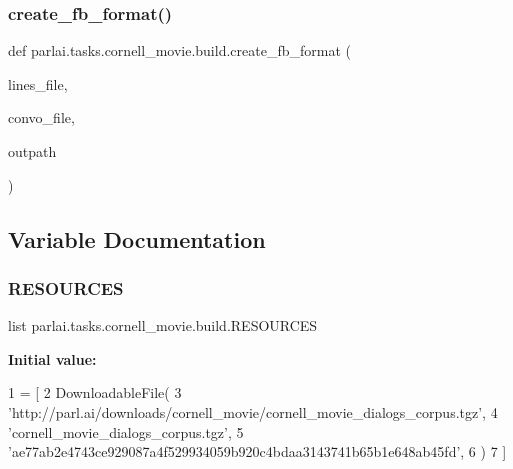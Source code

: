 \mbox{\label{namespaceparlai_1_1tasks_1_1cornell__movie_1_1build_ad02efe0879bce0da293ba177112e1af3}} 
\subsubsection{\texorpdfstring{create\+\_\+fb\+\_\+format()}{create\_fb\_format()}}
{\footnotesize\ttfamily def parlai.\+tasks.\+cornell\+\_\+movie.\+build.\+create\+\_\+fb\+\_\+format (\begin{DoxyParamCaption}\item[{}]{lines\+\_\+file,  }\item[{}]{convo\+\_\+file,  }\item[{}]{outpath }\end{DoxyParamCaption})}



\subsection{Variable Documentation}
\mbox{\label{namespaceparlai_1_1tasks_1_1cornell__movie_1_1build_a3ebe7bd780f6364ef3d5a12e120738cb}} 
\subsubsection{\texorpdfstring{R\+E\+S\+O\+U\+R\+C\+ES}{RESOURCES}}
{\footnotesize\ttfamily list parlai.\+tasks.\+cornell\+\_\+movie.\+build.\+R\+E\+S\+O\+U\+R\+C\+ES}

{\bfseries Initial value\+:}
\begin{DoxyCode}
1 =  [
2     DownloadableFile(
3         \textcolor{stringliteral}{'http://parl.ai/downloads/cornell\_movie/cornell\_movie\_dialogs\_corpus.tgz'},
4         \textcolor{stringliteral}{'cornell\_movie\_dialogs\_corpus.tgz'},
5         \textcolor{stringliteral}{'ae77ab2e4743ce929087a4f529934059b920c4bdaa3143741b65b1e648ab45fd'},
6     )
7 ]
\end{DoxyCode}
